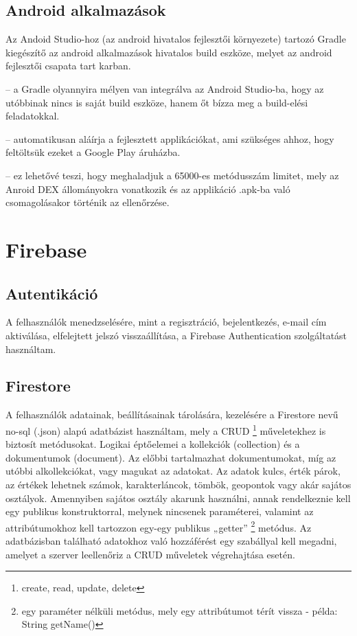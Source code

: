 \subsection{Android alkalmazások}

Az Andoid Studio-hoz (az android hivatalos fejlesztői környezete) tartozó Gradle kiegészítő az android alkalmazások hivatalos build eszköze, melyet az android fejlesztői csapata tart karban.

\begin{description}
	\setlength{\itemsep}{0.04mm}
	\item[Teljes integráció az Android Studio-val] -- a Gradle olyannyira mélyen van integrálva az Android Studio-ba, hogy az utóbbinak nincs is saját build eszköze, hanem őt bízza meg a build-elési feladatokkal.
	\item[Automatikus aláírás] -- automatikusan aláírja a fejlesztett applikációkat, ami szükséges ahhoz, hogy feltöltsük ezeket a Google Play áruházba.
	\item[Multidex támogatás] -- ez lehetővé teszi, hogy meghaladjuk a 65000-es metódusszám limitet, mely az Anroid DEX állományokra vonatkozik és az applikáció .apk-ba való csomagolásakor történik az ellenőrzése.
\end{description}

\section{Firebase}\label{sec:ALAP:szerkeszt}

\subsection{Autentikáció}

A felhasználók menedzselésére, mint a regisztráció, bejelentkezés, e-mail cím aktiválása, elfelejtett jelszó visszaállítása, a Firebase Authentication szolgáltatást használtam.


\subsection{Firestore}

A felhasználók adatainak, beállításainak tárolására, kezelésére a Firestore nevű no-sql (.json) alapú adatbázist használtam, mely a CRUD%
\footnote{ %
	create, read, update, delete
}  %
műveletekhez is biztosít metódusokat. Logikai éptőelemei a kollekciók (collection) és a dokumentumok (document). Az előbbi tartalmazhat dokumentumokat, míg az utóbbi alkollekciókat, vagy magukat az adatokat. Az adatok kulcs, érték párok, az értékek lehetnek számok, karakterláncok, tömbök, geopontok vagy akár sajátos osztályok. Amennyiben sajátos osztály akarunk használni, annak rendelkeznie kell egy publikus konstruktorral, melynek nincsenek paraméterei, valamint az attribútumokhoz kell tartozzon egy-egy publikus „getter”%
\footnote{ %
	egy paraméter nélküli metódus, mely egy attribútumot térít vissza - példa: String getName()
}  %
metódus. Az adatbázisban található adatokhoz való hozzáférést egy szabállyal kell megadni, amelyet a szerver leellenőriz a CRUD műveletek végrehajtása esetén.


